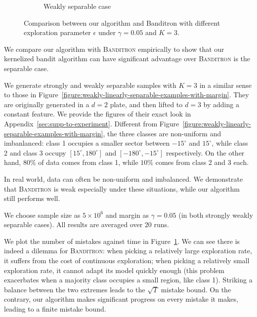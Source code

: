 \begin{figure}
\begin{subfigure}[b]{0.23\textwidth}
        \caption{Weakly separable case}
    \end{subfigure}
    \vspace*{-0.2cm}
    \caption{Comparison between our algorithm and Banditron with different exploration parameter $\epsilon$ under $\gamma=0.05$ and $K=3$. }
    \label{fig:both}
\end{figure}

We compare our algorithm with \textsc{Banditron} empirically to show that our kernelized bandit algorithm can have significant advantage over \textsc{Banditron} is the separable case. 

We generate strongly and weakly separable samples with $K=3$ in a similar sense to those in Figure~\ref{figure:weakly-linearly-separable-examples-with-margin}. They are originally generated in a $d=2$ plate, and then lifted to $d=3$ by adding a constant feature. We provide the figures of their exact look in Appendix~\ref{sec:supp-to-experiment}. Different from Figure~\ref{figure:weakly-linearly-separable-examples-with-margin}, the three classes are non-uniform and imbanlanced: class 1 occupies a smaller sector between $-15^\circ$ and $15^\circ$, while class 2 and class 3 occupy $[15^\circ, 180^\circ]$ and $[-180^\circ, -15^\circ]$ respectively. On the other hand, $80\%$ of data comes from class 1, while $10\%$ comes from class 2 and 3 each. 

In real world, data can often be non-uniform and imbalanced. We demonstrate that \textsc{Banditron} is weak especially under these situations, while our algorithm still performs well.

We choose sample size as $5\times 10^6$ and margin as $\gamma=0.05$ (in both strongly weakly separable cases). All results are averaged over $20$ runs. 

We plot the number of mistakes against time in Figure~\ref{fig:both}. We can see there is indeed a dilemma for \textsc{Banditron}: when picking a relatively large exploration rate, it suffers from the cost of continuous exploration; when picking a relatively small exploration rate, it cannot adapt its model quickly enough (this problem exacerbates when a majority class occupies a small region, like class 1). Striking a balance between the two extremes leads to the $\sqrt{T}$ mistake bound. On the contrary, our algorithm makes significant progress on every mistake it makes, leading to a finite mistake bound.  
